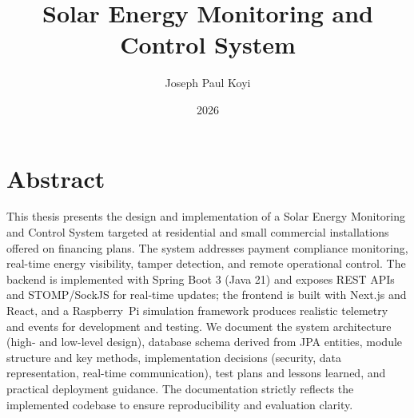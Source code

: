 \documentclass[
]{elteikthesis}[2024/04/26]
\title{Solar Energy Monitoring and Control System} %
\date{2026} %
\author{Joseph Paul Koyi}
\affiliation{Associate Professor} %
\begin{document}


\maketitle

\chapter*{Abstract}
This thesis presents the design and implementation of a Solar Energy Monitoring and Control System targeted at residential and small commercial installations offered on financing plans. The system addresses payment compliance monitoring, real-time energy visibility, tamper detection, and remote operational control. The backend is implemented with Spring Boot 3 (Java 21) and exposes REST APIs and STOMP/SockJS for real-time updates; the frontend is built with Next.js and React, and a Raspberry~Pi simulation framework produces realistic telemetry and events for development and testing. We document the system architecture (high- and low-level design), database schema derived from JPA entities, module structure and key methods, implementation decisions (security, data representation, real-time communication), test plans and lessons learned, and practical deployment guidance. The documentation strictly reflects the implemented codebase to ensure reproducibility and evaluation clarity.

\tableofcontents
\cleardoublepage

{}
\listoffigures
\cleardoublepage

{}
\listoftables
\cleardoublepage

{}
\lstlistoflistings
\cleardoublepage




\end{document}
